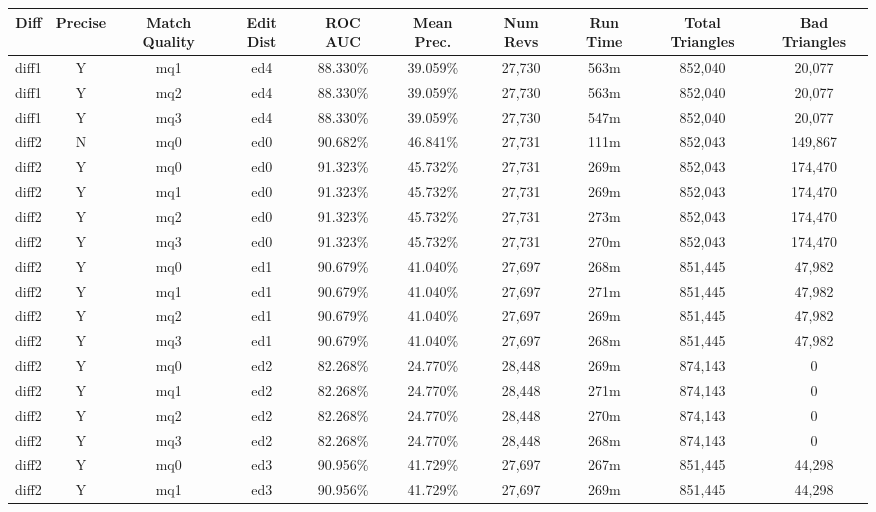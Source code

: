 \begin{sidewaystable}[!tp]
  \begin{center}
    \begin{tabular}{|c|c|c|c||c|c||c|c|c|c|}
\hline
Diff & Precise & Match Quality & Edit Dist
        & ROC AUC & Mean Prec.
        & Num Revs & Run Time
        & Total Triangles & Bad Triangles \\
\hline
\hline
diff1 & Y & mq1 & ed4 & 88.330\% & 39.059\% & 27,730 & 563m & 852,040 & 20,077 \\
diff1 & Y & mq2 & ed4 & 88.330\% & 39.059\% & 27,730 & 563m & 852,040 & 20,077 \\
diff1 & Y & mq3 & ed4 & 88.330\% & 39.059\% & 27,730 & 547m & 852,040 & 20,077 \\
diff2 & N & mq0 & ed0 & 90.682\% & 46.841\% & 27,731 & 111m & 852,043 & 149,867 \\
diff2 & Y & mq0 & ed0 & 91.323\% & 45.732\% & 27,731 & 269m & 852,043 & 174,470 \\
diff2 & Y & mq1 & ed0 & 91.323\% & 45.732\% & 27,731 & 269m & 852,043 & 174,470 \\
diff2 & Y & mq2 & ed0 & 91.323\% & 45.732\% & 27,731 & 273m & 852,043 & 174,470 \\
diff2 & Y & mq3 & ed0 & 91.323\% & 45.732\% & 27,731 & 270m & 852,043 & 174,470 \\
diff2 & Y & mq0 & ed1 & 90.679\% & 41.040\% & 27,697 & 268m & 851,445 & 47,982 \\
diff2 & Y & mq1 & ed1 & 90.679\% & 41.040\% & 27,697 & 271m & 851,445 & 47,982 \\
diff2 & Y & mq2 & ed1 & 90.679\% & 41.040\% & 27,697 & 269m & 851,445 & 47,982 \\
diff2 & Y & mq3 & ed1 & 90.679\% & 41.040\% & 27,697 & 268m & 851,445 & 47,982 \\
diff2 & Y & mq0 & ed2 & 82.268\% & 24.770\% & 28,448 & 269m & 874,143 & 0 \\
diff2 & Y & mq1 & ed2 & 82.268\% & 24.770\% & 28,448 & 271m & 874,143 & 0 \\
diff2 & Y & mq2 & ed2 & 82.268\% & 24.770\% & 28,448 & 270m & 874,143 & 0 \\
diff2 & Y & mq3 & ed2 & 82.268\% & 24.770\% & 28,448 & 268m & 874,143 & 0 \\
diff2 & Y & mq0 & ed3 & 90.956\% & 41.729\% & 27,697 & 267m & 851,445 & 44,298 \\
diff2 & Y & mq1 & ed3 & 90.956\% & 41.729\% & 27,697 & 269m & 851,445 & 44,298 \\

\end{tabular}
\end{center}
\end{sidewaystable}

